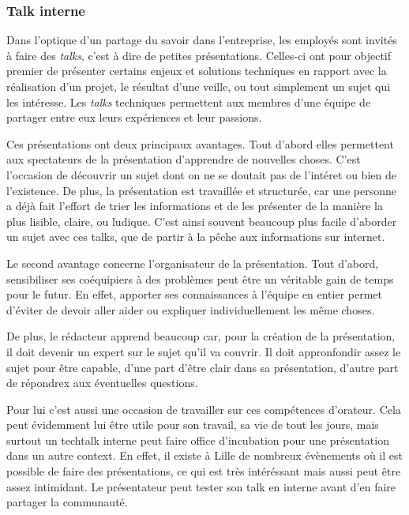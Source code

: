 \documentclass[12pt,a4paper]{article}
\begin{document}
  \bigskip

  \subsubsection{Talk interne}\label{talk-interne}

  \bigskip

  Dans l'optique d'un partage du savoir dans l'entreprise, les employés
  sont invités à faire des \emph{talks}, c'est à dire de petites
  présentations. Celles-ci ont pour objectif premier de présenter certains
  enjeux et solutions techniques en rapport avec la réalisation d'un
  projet, le résultat d'une veille, ou tout simplement un sujet qui les
  intéresse. Les \emph{talks} techniques permettent aux membres d'une
  équipe de partager entre eux leurs expériences et leur passions.

  \bigskip

  Ces présentations ont deux principaux avantages. Tout d'abord elles
  permettent aux spectateurs de la présentation d'apprendre de nouvelles
  choses. C'est l'occasion de découvrir un sujet dont on ne se doutait pas
  de l'intéret ou bien de l'existence. De plus, la présentation est
  travaillée et structurée, car une personne a déjà fait l'effort de trier
  les informations et de les présenter de la manière la plus lisible,
  claire, ou ludique. C'est ainsi souvent beaucoup plus facile d'aborder
  un sujet avec ces talks, que de partir à la pêche aux informations sur
  internet.

  \bigskip

  Le second avantage concerne l'organisateur de la présentation. Tout
  d'abord, sensibiliser ses coéquipiers à des problèmes peut être un
  véritable gain de temps pour le futur. En effet, apporter ses
  connaissances à l'équipe en entier permet d'éviter de devoir aller aider
  ou expliquer individuellement les même choses.

  \bigskip

  De plus, le rédacteur apprend beaucoup car, pour la création de la
  présentation, il doit devenir un expert sur le sujet qu'il va couvrir.
  Il doit appronfondir assez le sujet pour être capable, d'une part d'être
  clair dans sa présentation, d'autre part de répondrex aux éventuelles
  questions.

  \bigskip

  Pour lui c'est aussi une occasion de travailler sur ces compétences
  d'orateur. Cela peut évidemment lui être utile pour son travail, sa vie
  de tout les jours, mais surtout un techtalk interne peut faire office
  d'incubation pour une présentation dans un autre context. En effet, il
  existe à Lille de nombreux évènements où il est possible de faire des
  présentations, ce qui est très intéréssant mais aussi peut être assez
  intimidant. Le présentateur peut tester son talk en interne avant d'en
  faire partager la communauté.
\end{document}
